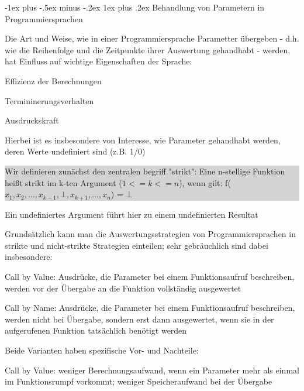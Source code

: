 \documentclass[10pt]{article}
\makeatletter
\renewcommand{\subsubsection}{\@startsection{subsubsection}{3}{0mm}%
                                {-1ex plus -.5ex minus -.2ex}%
                                {1ex plus .2ex}%
                                {\normalfont\small\bfseries}}
\makeatother
\begin{document}
\subsubsection{Behandlung von Parametern in Programmiersprachen}
\begin{itemize*}
  \item Die Art und Weise, wie in einer Programmiersprache Parametter übergeben - d.h. wie die Reihenfolge und die Zeitpunkte ihrer Auswertung gehandhabt - werden, hat Einfluss auf wichtige Eigenschaften der Sprache:
  \begin{itemize*}
    \item Effizienz der Berechnungen
    \item Termininerungsverhalten
    \item Ausdruckskraft
  \end{itemize*}
  \item Hierbei ist es insbesondere von Interesse, wie Parameter gehandhabt werden, deren Werte undefiniert sind (z.B. 1/0)\newline
  \colorbox{lightgray}{
    \begin{minipage}[h]{1.0\linewidth}
      Wir definieren zunächst den zentralen begriff "strikt": \newline Eine n-stellige Funktion heißt strikt im k-ten Argument ($1<=k<=n$), wenn gilt: f($x_1,x_2,…,x_{k-1},\bot,x_{k+1},…,x_n$) = $\bot$
    \end{minipage}}
  \item Ein undefiniertes Argument führt hier zu einem undefinierten Resultat
  \item Grundsätzlich kann man die Auswertungsstrategien von Programmiersprachen in strikte und nicht-strikte Strategien einteilen; sehr gebräuchlich sind dabei insbesondere:
  \begin{itemize*}
    \item Call by Value: Ausdrücke, die Parameter bei einem Funktionsaufruf beschreiben, werden vor der Übergabe an die Funktion vollständig ausgewertet
    \item Call by Name: Ausdrücke, die Parameter bei einem Funktionsaufruf beschreiben, werden nicht bei Übergabe, sondern erst dann ausgewertet, wenn sie in der aufgerufenen Funktion tatsächlich benötigt werden
  \end{itemize*}
  \item Beide Varianten haben spezifische Vor- und Nachteile:
  \begin{itemize*}
    \item Call by Value: weniger Berechnungsaufwand, wenn ein Parameter mehr als einmal im Funktionsrumpf vorkommt; weniger Speicheraufwand bei der Übergabe

\end{itemize*}
\end{itemize*}
\end{document}
